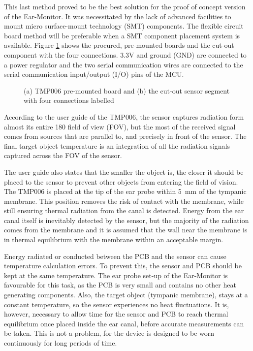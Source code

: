 \medskip

This last method proved to be the best solution for the proof of concept version of the Ear-Monitor. It was necessitated by the lack of advanced facilities to mount micro surface-mount technology (SMT) components. The flexible circuit board method will be preferable when a SMT component placement system is available. Figure \ref{fig:TMP006_Breakout} shows the procured, pre-mounted boards and the cut-out component with the four connections. 3.3V and ground (GND) are connected to a power regulator and the two serial communication wires are connected to the serial communication input/output (I/O) pins of the MCU.

\begin{figure}[h]
\centering
\graphicspath{{figs/}}

\caption[TMP006 PCB]{(a) TMP006 pre-mounted board and (b) the cut-out sensor segment with four connections labelled}
\label{fig:TMP006_Breakout}
\end{figure}

According to the user guide of the TMP006, the sensor captures radiation form almost its entire 180\textdegree{} field of view (FOV), but the most of the received signal comes from sources that are parallel to, and precisely in front of the sensor. The final target object temperature is an integration of all the radiation signals captured across the FOV of the sensor.

\medskip

The user guide also states that the smaller the object is, the closer it should be placed to the sensor to prevent other objects from entering the field of vision. The TMP006 is placed at the tip of the ear probe within \SI{5}{\milli\meter} of the tympanic membrane. This position removes the risk of contact with the membrane, while still ensuring thermal radiation from the canal is detected. Energy from the ear canal itself is inevitably detected by the sensor, but the majority of the radiation comes from the membrane and it is assumed that the wall near the membrane is in thermal equilibrium with the membrane within an acceptable margin.

\medskip

Energy radiated or conducted between the PCB and the sensor can cause temperature calculation errors. To prevent this, the sensor and PCB should be kept at the same temperature. The ear probe set-up of the Ear-Monitor is favourable for this task, as the PCB is very small and contains no other heat generating components. Also, the target object (tympanic membrane), stays at a constant temperature, so the sensor experiences no heat fluctuations. It is, however, necessary to allow time for the sensor and PCB to reach thermal equilibrium once placed inside the ear canal, before accurate measurements can be taken. This is not a problem, for the device is designed to be worn continuously for long periods of time.

